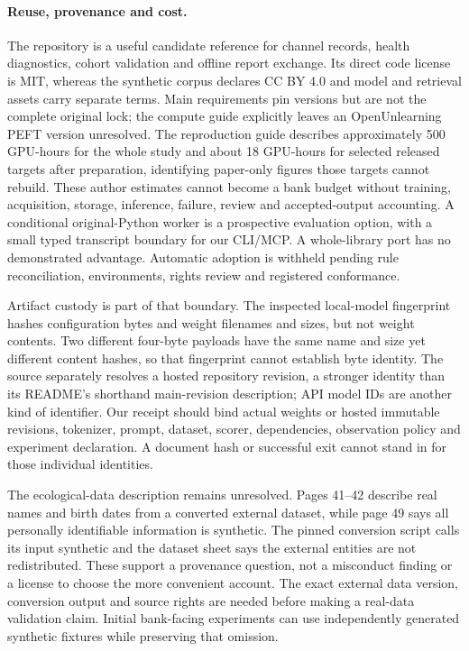 \paragraph{Reuse, provenance and cost.}
The repository is a useful candidate reference for channel records, health
diagnostics, cohort validation and offline report exchange. Its direct code
license is MIT, whereas the synthetic corpus declares CC BY 4.0 and model and
retrieval assets carry separate terms. Main requirements pin versions but are
not the complete original lock; the compute guide explicitly leaves an
OpenUnlearning PEFT version unresolved. The reproduction guide describes
approximately 500 GPU-hours for the whole study and about 18 GPU-hours for
selected released targets after preparation, identifying paper-only figures
those targets cannot rebuild. These author estimates cannot become a bank
budget without training, acquisition, storage, inference, failure, review and
accepted-output accounting. A conditional original-Python worker is a prospective
evaluation option, with a small typed transcript boundary for our CLI/MCP.
A whole-library port has no demonstrated advantage. Automatic adoption is
withheld pending rule reconciliation, environments, rights review and registered
conformance.\citep{exec24_unlearning_software}

Artifact custody is part of that boundary. The inspected local-model fingerprint
hashes configuration bytes and weight filenames and sizes, but not weight
contents. Two different four-byte payloads have the same name and size yet
different content hashes, so that fingerprint cannot establish byte identity.
The source separately resolves a hosted repository revision, a stronger identity
than its README's shorthand main-revision description; API model IDs are another
kind of identifier. Our receipt should bind actual weights or hosted immutable
revisions, tokenizer, prompt, dataset, scorer, dependencies, observation policy
and experiment declaration. A document hash or successful exit cannot stand in
for those individual identities.\citep{exec24_unlearning_software,exec24_unlearning_reference}

The ecological-data description remains unresolved. Pages 41--42 describe real
names and birth dates from a converted external dataset, while page 49 says all
personally identifiable information is synthetic. The pinned conversion script
calls its input synthetic and the dataset sheet says the external entities are
not redistributed. These support a provenance question, not a misconduct finding
or a license to choose the more convenient account. The exact external data
version, conversion output and source rights are needed before making a
real-data validation claim. Initial bank-facing experiments can use independently
generated synthetic fixtures while preserving that omission.
\citep{exec24_unlearning_original,exec24_unlearning_software}

